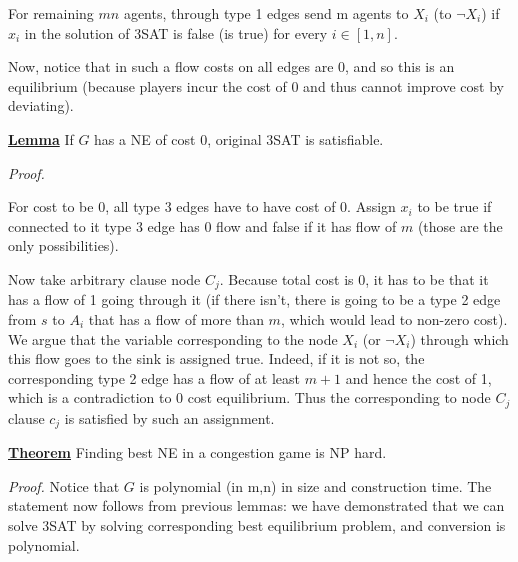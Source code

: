 For remaining $mn$ agents, through type 1 edges send m agents to $X_i$ (to $\neg X_i$) if $x_i$ in the solution of 3SAT is false (is true) for every $i\in[1,n]$.

Now, notice that in such a flow costs on all edges are 0, and so this is an equilibrium (because players incur the cost of 0 and thus cannot improve cost by deviating).

\uline{\textbf{Lemma}} If  $G$ has a NE of cost 0, original 3SAT is satisfiable.

\textit{Proof.}

For cost to be 0, all type 3 edges have to have cost of 0. Assign $x_i$ to be true if connected to it type 3 edge has 0 flow and false if it has flow of $m$ (those are the only possibilities). 

Now take arbitrary clause node $C_j$. Because total cost is 0, it has to be that it has a flow of 1 going through it (if there isn't, there is going to be a type 2 edge from $s$ to $A_i$ that has a flow of more than $m$, which would lead to non-zero cost). We argue that the variable corresponding to the node $X_i$ (or $\neg X_i$) through which this flow goes to the sink is assigned true. Indeed, if it is not so, the corresponding type 2 edge has a flow of at least $m+1$ and hence the cost of 1, which is a contradiction to 0 cost equilibrium. Thus the corresponding to node $C_j$ clause $c_j$ is satisfied by such an assignment.

\uline{\textbf{Theorem}} Finding best NE in a congestion game is NP hard.

\textit{Proof.} Notice that $G$ is polynomial (in m,n) in size and construction time. The statement now follows from previous lemmas: we have demonstrated that we can solve 3SAT by solving corresponding best equilibrium problem, and conversion is polynomial.

